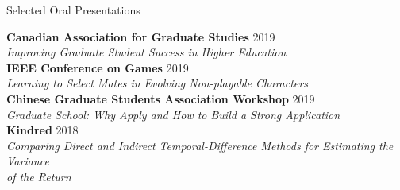 \documentclass{cv}
\begin{document}
\begin{rSection}{Selected Oral Presentations}

{\bf Canadian Association for Graduate Studies} \hfill 2019 \vspace{0.1em}\\
{\em Improving Graduate Student Success in Higher Education} \vspace{0.5em}\\
{\bf IEEE Conference on Games} \hfill 2019 \vspace{0.1em}\\
{\em Learning to Select Mates in Evolving Non-playable Characters} \vspace{0.5em}\\
{\bf Chinese Graduate Students Association Workshop} \hfill 2019 \vspace{0.1em}\\
{\em Graduate School: Why Apply and How to Build a Strong Application} \vspace{0.5em}\\
{\bf Kindred} \hfill 2018 \vspace{0.1em}\\
{\em Comparing Direct and Indirect Temporal-Difference Methods for Estimating the Variance\\of the Return}

\end{rSection}

\end{document}
